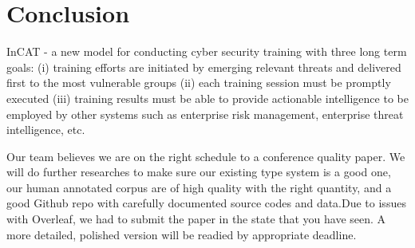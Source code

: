 \documentclass[conference]{IEEEtran}
\begin{document}
\section{Conclusion}

InCAT - a new model for conducting cyber security training with three long term goals: (i) training efforts are initiated by emerging relevant threats and delivered first to the most vulnerable groups (ii) each training session must be promptly executed (iii) training results must be able to provide actionable intelligence to be employed by other systems such as enterprise risk management, enterprise threat intelligence, etc.

Our team believes we are on the right schedule to a conference quality paper. We will do further researches to make sure our existing type system is a good one, our human annotated corpus are of high quality with the right quantity, and a good Github repo with carefully documented source codes and data.Due to issues with Overleaf, we had to submit the paper in the state that you have seen. A more detailed, polished version will be readied by appropriate deadline.

%

\end{document}
